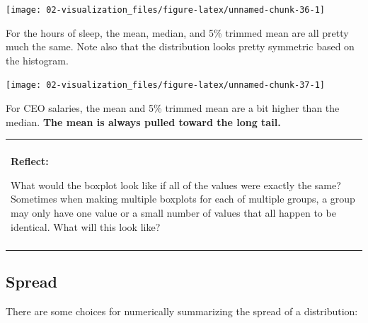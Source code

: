 \documentclass[
]{book}
\newenvironment{reflect}
{
    \begin{center}
    
    \begin{tabular}{|p{0.8\textwidth}|}
    \rowcolor{LightBlue}
    \hline\\
    \rowcolor{LightBlue}
    \textbf{Reflect:}
}
{
    \\\rowcolor{LightBlue}
    \\\hline
    \end{tabular} 
    \end{center}
}
\begin{document}
\begin{center}\texttt{[image: 02-visualization\_files/figure-latex/unnamed-chunk-36-1]} \end{center}

For the hours of sleep, the mean, median, and 5\% trimmed mean are all pretty much the same. Note also that the distribution looks pretty symmetric based on the histogram.

\begin{center}\texttt{[image: 02-visualization\_files/figure-latex/unnamed-chunk-37-1]} \end{center}

For CEO salaries, the mean and 5\% trimmed mean are a bit higher than the median. \textbf{The mean is always pulled toward the long tail.}

\begin{reflect}
What would the boxplot look like if all of the values were exactly the
same? Sometimes when making multiple boxplots for each of multiple
groups, a group may only have one value or a small number of values that
all happen to be identical. What will this look like?
\end{reflect}

\hypertarget{spread}{%
\subsection{Spread}\label{spread}}

There are some choices for numerically summarizing the spread of a distribution:
\end{document}
